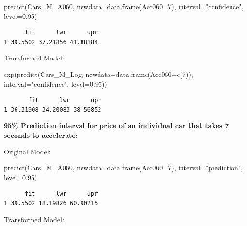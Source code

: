 \documentclass[
  letterpaper,
  DIV=11,
  numbers=noendperiod]{scrreprt}
\newenvironment{Shaded}{\begin{snugshade}}{\end{snugshade}}
\newcommand{\AttributeTok}[1]{\textcolor[rgb]{0.40,0.45,0.13}{#1}}
\newcommand{\DecValTok}[1]{\textcolor[rgb]{0.68,0.00,0.00}{#1}}
\newcommand{\FloatTok}[1]{\textcolor[rgb]{0.68,0.00,0.00}{#1}}
\newcommand{\FunctionTok}[1]{\textcolor[rgb]{0.28,0.35,0.67}{#1}}
\newcommand{\NormalTok}[1]{\textcolor[rgb]{0.00,0.23,0.31}{#1}}
\newcommand{\StringTok}[1]{\textcolor[rgb]{0.13,0.47,0.30}{#1}}
\begin{document}
\begin{Shaded}
\begin{Highlighting}[]
\FunctionTok{predict}\NormalTok{(Cars\_M\_A060, }\AttributeTok{newdata=}\FunctionTok{data.frame}\NormalTok{(}\AttributeTok{Acc060=}\DecValTok{7}\NormalTok{), }\AttributeTok{interval=}\StringTok{"confidence"}\NormalTok{, }\AttributeTok{level=}\FloatTok{0.95}\NormalTok{)}
\end{Highlighting}
\end{Shaded}

\begin{verbatim}
      fit      lwr      upr
1 39.5502 37.21856 41.88184
\end{verbatim}

Transformed Model:

\begin{Shaded}
\begin{Highlighting}[]
\FunctionTok{exp}\NormalTok{(}\FunctionTok{predict}\NormalTok{(Cars\_M\_Log, }\AttributeTok{newdata=}\FunctionTok{data.frame}\NormalTok{(}\AttributeTok{Acc060=}\FunctionTok{c}\NormalTok{(}\DecValTok{7}\NormalTok{)), }\AttributeTok{interval=}\StringTok{"confidence"}\NormalTok{, }\AttributeTok{level=}\FloatTok{0.95}\NormalTok{))}
\end{Highlighting}
\end{Shaded}

\begin{verbatim}
       fit      lwr      upr
1 36.31908 34.20083 38.56852
\end{verbatim}

\textbf{95\% Prediction interval for price of an individual car that
takes 7 seconds to accelerate:}

Original Model:

\begin{Shaded}
\begin{Highlighting}[]
\FunctionTok{predict}\NormalTok{(Cars\_M\_A060, }\AttributeTok{newdata=}\FunctionTok{data.frame}\NormalTok{(}\AttributeTok{Acc060=}\DecValTok{7}\NormalTok{), }\AttributeTok{interval=}\StringTok{"prediction"}\NormalTok{, }\AttributeTok{level=}\FloatTok{0.95}\NormalTok{)}
\end{Highlighting}
\end{Shaded}

\begin{verbatim}
      fit      lwr      upr
1 39.5502 18.19826 60.90215
\end{verbatim}

Transformed Model:
\end{document}
